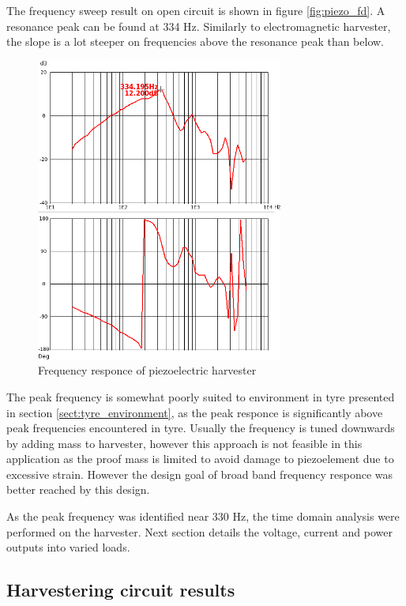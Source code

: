 The frequency sweep result on open circuit is shown in figure \ref{fig:piezo_fd}. A resonance peak can be found at 334 Hz. Similarly to electromagnetic harvester, the slope is a lot steeper on frequencies above the resonance peak than below. 

\begin{figure}[htb]
\begin{center}
\includegraphics[height=10cm]{images/own_measurement/generator_shaker/piezo_fd_open_2_3.png}
\end{center}
\caption{\label{fig:piezo_td_vi} Frequency responce of piezoelectric harvester}
\end{figure}


The peak frequency is somewhat poorly suited to environment in tyre presented in section \ref{sect:tyre_environment}, as the peak responce is significantly above peak frequencies encountered in tyre. Usually the frequency is tuned downwards by adding mass to harvester, however this approach is not feasible in this application as the proof mass is limited to avoid damage to piezoelement due to excessive strain. However the design goal of broad band frequency responce was better reached by this design.

As the peak frequency was identified near 330 Hz, the time domain analysis were performed on the harvester. Next section details the voltage, current and power outputs into varied loads.

\subsection{Harvestering circuit results}
